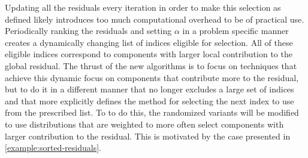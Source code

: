 \documentclass{article}
\theoremstyle{definition}
\theoremstyle{example}
\theoremstyle{example}
\theoremstyle{example}
\begin{document}
Updating all the residuals every iteration in order to make this selection as defined likely introduces too much computational overhead to be of practical use. Periodically ranking the residuals and setting $\alpha$ in a problem specific manner creates a dynamically changing list of indices eligible for selection. All of these eligible indices correspond to components with larger local contribution to the global residual. The thrust of the new algorithms is to focus on techniques that achieve this dynamic focus on components that contribute more to the residual, but to do it in a different manner that no longer excludes a large set of indices and that more explicitly defines the method for selecting the next index to use from the prescribed list. To to do this, the randomized variants will be modified to use distributions that are weighted to more often select components with larger contribution to the residual. This is motivated by the case presented in \cref{example:sorted-residuals}.
\end{document}
